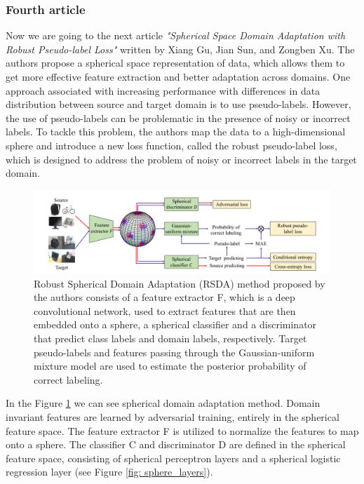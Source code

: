 \subsubsection{Fourth article}

Now we are going to the next article \textit{"Spherical Space Domain Adaptation with Robust Pseudo-label Loss"} written by  Xiang Gu, Jian Sun, and Zongben Xu. \cite{gu2020spherical} The authors propose a spherical space representation of data, which allows them to get more effective feature extraction and better adaptation across domains. One approach associated with increasing performance with differences in data distribution between source and target domain is to use pseudo-labels. However, the use of pseudo-labels can be problematic in the presence of noisy or incorrect labels. To tackle this problem, the authors map the data to a high-dimensional sphere and introduce a new loss function, called the robust pseudo-label loss, which is designed to address the problem of noisy or incorrect labels in the target domain. 

\begin{figure}[H]
    \centering
    \includegraphics[width=\textwidth]{Figures/From articles/RSDA_scheme.png}
    \caption{Robust Spherical Domain Adaptation (RSDA) method proposed by the authors consists of a feature extractor F, which is a deep convolutional network, used to extract features that are then embedded onto a sphere, a spherical classifier and a discriminator that predict class labels and domain labels, respectively. Target pseudo-labels and features passing through the Gaussian-uniform mixture model are used to estimate the posterior probability of correct labeling.}
    \label{fig: RSDA_scheme}
\end{figure}

In the Figure \ref{fig: RSDA_scheme} we can see spherical domain adaptation method. Domain invariant features are learned by adversarial training, entirely in the spherical feature space.  The feature extractor F is utilized to normalize the features to map onto a sphere. The classifier C and discriminator D are defined in the spherical feature space, consisting of spherical perceptron layers and a spherical logistic regression layer (see Figure \ref{fig: sphere_layers}). 

